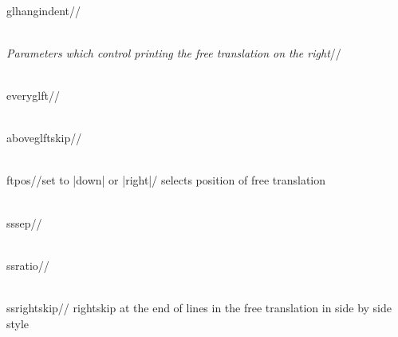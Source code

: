 {\\glhangindent//\par
\\{\it Parameters which control printing the free translation on the
right}//\par
\\everyglft//\par
\\aboveglftskip//\par
\\ftpos//set to |down| or |right|/ selects position of free translation\par
\\sssep//\par
\\ssratio//\par
\\ssrightskip// rightskip at the end of lines in the free translation
in side by side style\par
}


